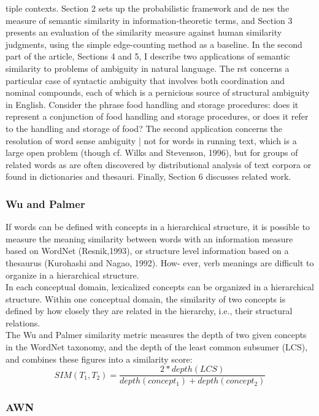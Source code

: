 tiple contexts. Section 2 sets up the probabilistic framework and de nes the measure of semantic similarity in information-theoretic terms, and Section 3 presents an evaluation of the similarity measure against human similarity judgments, using the simple edge-counting method as a baseline.
    In the second part of the article, Sections 4 and 5, I describe two applications of semantic similarity to problems of ambiguity in natural language. The rst concerns a particular case of syntactic ambiguity that involves both coordination and nominal compounds, each of which is a pernicious source of structural ambiguity in English. Consider the phrase food handling and storage procedures: does it represent a conjunction of food handling and storage procedures, or does it refer to the handling and storage of food? The second application concerns the resolution of word sense ambiguity | not for words in running text, which is a large open problem (though cf. Wilks and Stevenson, 1996), but for groups of related words
as are often discovered by distributional analysis of text corpora or found in dictionaries and thesauri. Finally, Section 6 discusses related work.
\subsubsection{Wu and Palmer}
    If words can be defined with concepts in a hierarchical structure, it is possible to measure the meaning similarity between words with an information measure based on WordNet (Resnik,1993), or structure level information based on a thesaurus (Kurohashi and Nagao, 1992). How-
ever, verb meanings are difficult to organize in a hierarchical structure.\\
In each conceptual domain, lexicalized concepts can be organized in a hierarchical structure. Within one conceptual domain, the similarity of two concepts is defined by how closely they are related in the hierarchy, i.e., their structural relations.\\

The Wu and Palmer \citep{wu} similarity metric measures the depth of two given concepts in the WordNet taxonomy, and the depth of the least common subsumer (LCS), and combines these figures into a similarity score:
\begin{equation}
SIM({T_{1}},{T_{2}}) =\frac{2 * depth(LCS)}{depth(concept_1)+ depth(concept_2)} 
\end{equation}


\subsubsection{AWN}

